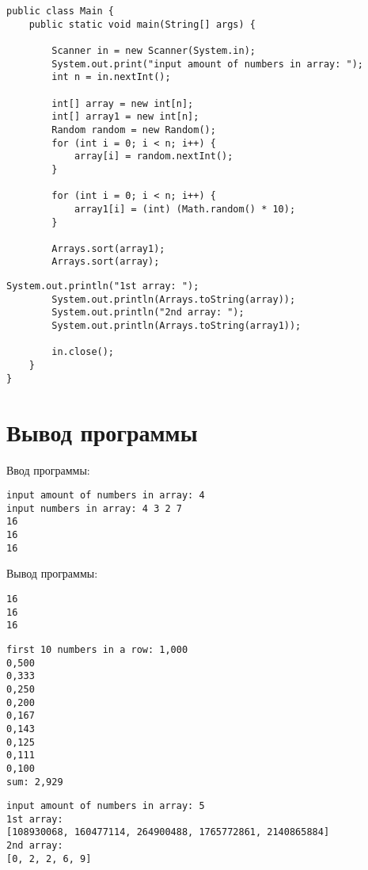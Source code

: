 \documentclass[14pt, a4paper]{extarticle}
\newenvironment{code}{\captionsetup{type=listing}}{}
\begin{document}
\begin{code}
\begin{Verbatim}[frame=single, fontsize=\footnotesize]
public class Main {
    public static void main(String[] args) {

        Scanner in = new Scanner(System.in);
        System.out.print("input amount of numbers in array: ");
        int n = in.nextInt();

        int[] array = new int[n];
        int[] array1 = new int[n];
        Random random = new Random();
        for (int i = 0; i < n; i++) {
            array[i] = random.nextInt();
        }

        for (int i = 0; i < n; i++) {
            array1[i] = (int) (Math.random() * 10);
        }

        Arrays.sort(array1);
        Arrays.sort(array);
\end{Verbatim}
\end{code}

\begin{code}
\begin{Verbatim}[frame=single, fontsize=\footnotesize]
        System.out.println("1st array: ");
        System.out.println(Arrays.toString(array));
        System.out.println("2nd array: ");
        System.out.println(Arrays.toString(array1));

        in.close();
    }
}
\end{Verbatim}
\end{code}
\section*{Вывод программы}
Ввод программы:
\begin{code}
\begin{Verbatim}[frame=single, fontsize=\footnotesize]
input amount of numbers in array: 4
input numbers in array: 4 3 2 7
16
16
16
\end{Verbatim}
\end{code}
Вывод программы:
\begin{code}
\begin{Verbatim}[frame=single, fontsize=\footnotesize]
16
16
16
\end{Verbatim}
\end{code}
\begin{code}
\begin{Verbatim}[frame=single, fontsize=\footnotesize]
first 10 numbers in a row: 1,000
0,500
0,333
0,250
0,200
0,167
0,143
0,125
0,111
0,100
sum: 2,929
\end{Verbatim}
\end{code}
\begin{code}
\begin{Verbatim}[frame=single, fontsize=\footnotesize]
input amount of numbers in array: 5
1st array: 
[108930068, 160477114, 264900488, 1765772861, 2140865884]
2nd array: 
[0, 2, 2, 6, 9]
\end{Verbatim}
\end{code}
\end{document}
